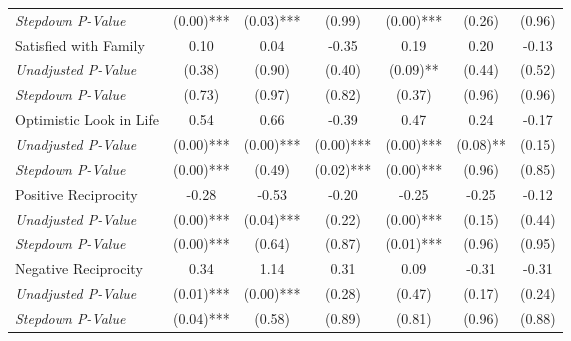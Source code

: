 \begin{tabular}{l c c c c c c}
\quad \textit{Stepdown P-Value} & (0.00)*** & (0.03)*** & (0.99) & (0.00)*** & (0.26) & (0.96) \\
Satisfied with Family & 0.10 & 0.04 & -0.35 & 0.19 & 0.20 & -0.13 \\
\quad \textit{Unadjusted P-Value} & (0.38) & (0.90) & (0.40) & (0.09)** & (0.44) & (0.52) \\
\quad \textit{Stepdown P-Value} & (0.73) & (0.97) & (0.82) & (0.37) & (0.96) & (0.96) \\
Optimistic Look in Life & 0.54 & 0.66 & -0.39 & 0.47 & 0.24 & -0.17 \\
\quad \textit{Unadjusted P-Value} & (0.00)*** & (0.00)*** & (0.00)*** & (0.00)*** & (0.08)** & (0.15) \\
\quad \textit{Stepdown P-Value} & (0.00)*** & (0.49) & (0.02)*** & (0.00)*** & (0.96) & (0.85) \\
Positive Reciprocity & -0.28 & -0.53 & -0.20 & -0.25 & -0.25 & -0.12 \\
\quad \textit{Unadjusted P-Value} & (0.00)*** & (0.04)*** & (0.22) & (0.00)*** & (0.15) & (0.44) \\
\quad \textit{Stepdown P-Value} & (0.00)*** & (0.64) & (0.87) & (0.01)*** & (0.96) & (0.95) \\
Negative Reciprocity & 0.34 & 1.14 & 0.31 & 0.09 & -0.31 & -0.31 \\
\quad \textit{Unadjusted P-Value} & (0.01)*** & (0.00)*** & (0.28) & (0.47) & (0.17) & (0.24) \\
\quad \textit{Stepdown P-Value} & (0.04)*** & (0.58) & (0.89) & (0.81) & (0.96) & (0.88) \\
\bottomrule
\end{tabular}
